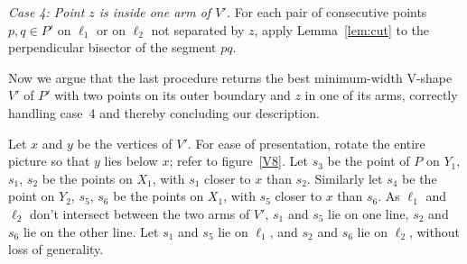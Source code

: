 \documentclass{llncs}
\begin{document}
\emph{Case 4: Point $z$ is inside one arm of $V'$.}
For each pair of consecutive points $p,q \in P'$ on $\ell_1$ or
on $\ell_2$ not separated by $z$, apply Lemma~\ref{lem:cut} to the
perpendicular bisector of the segment $pq$.

Now we argue that the last procedure returns the best minimum-width
V-shape $V'$ of $P'$ with two points on its outer boundary and $z$ in
one of its arms, correctly handling case~4 and thereby concluding our description.

Let $x$ and $y$ be the vertices of $V'$.  For ease of presentation,
rotate the entire picture so that $y$ lies below $x$; refer to figure~\ref{V8}.
Let $s_3$ be the point of $P$ on $Y_1$, $s_1$, $s_2$ be the points on $X_1$, with $s_1$ closer to $x$ than $s_2$.
Similarly let $s_4$ be the point on $Y_2$, $s_5$, $s_6$ be the points on $X_1$, with $s_5$ closer to $x$ than $s_6$. As $\ell_1$ and $\ell_2$ don't intersect between the two arms of $V'$, $s_1$ and $s_5$ lie on one line, $s_2$ and $s_6$ lie on the other line.
Let $s_1$ and $s_5$ lie on $\ell_1$, and $s_2$ and $s_6$ lie on
$\ell_2$, without loss of generality.
\end{document}
